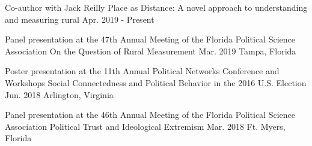 

\begin{cventries}



\cventry
  {Co-author with Jack Reilly} %
  {Place as Distance: A novel approach to understanding and measuring rural} %
  {Apr. 2019 - Present} %
  {} %
  {}

\vspace{-.25cm}
\cventry
  {Panel presentation at the 47th Annual Meeting of the Florida Political Science Association} %
  {On the Question of Rural Measurement} %
  {Mar. 2019} %
  {Tampa, Florida} %
  {}

\vspace{-.25cm}
\cventry
  {Poster presentation at the 11th Annual Political Networks Conference and Workshops} %
  {Social Connectedness and Political Behavior in the 2016 U.S. Election} %
  {Jun. 2018} %
  {Arlington, Virginia} %
  {}

\vspace{-.25cm}
\cventry
  {Panel presentation at the 46th Annual Meeting of the Florida Political Science Association} %
  {Political Trust and Ideological Extremism} %
  {Mar. 2018} %
  {Ft. Myers, Florida} %
  {}

\vspace{-.25cm}


\end{cventries}
